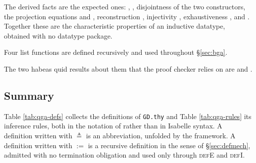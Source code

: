 
\noindent
The derived facts are the expected ones: ,
, disjointness of the two
constructors, the projection equations  and
, reconstruction
,
injectivity , exhaustiveness
, and
.  Together these are the characteristic properties of an
inductive datatype, obtained with no datatype package.

Four list functions are defined recursively and used throughout
\S\ref{sec:bga}.


\noindent
The two habeas quid results about them that the proof checker relies on are
 and
.

\subsection{Summary}
\label{sec:qga-summary}

Table \ref{tab:qga-defs} collects the definitions of \texttt{GD.thy} and
Table \ref{tab:qga-rules} its inference rules, both in the notation of \QGA{}
rather than in Isabelle syntax.  A definition written with $\triangleq$ is an
abbreviation, unfolded by the framework.  A definition written with $:=$ is a
\QGA{} recursive definition in the sense of \S\ref{sec:defmech}, admitted with
no termination obligation and used only through \textsc{defE} and
\textsc{defI}.

